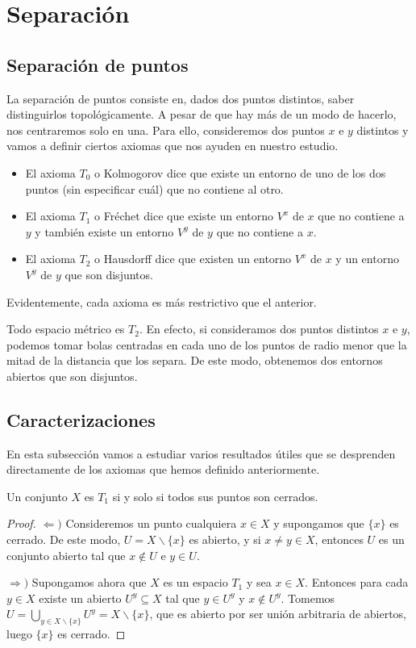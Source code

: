 \chapter{Separación}

\section{Separación de puntos} 

La separación de puntos consiste en, dados dos puntos distintos, saber distinguirlos topológicamente. A pesar de que hay más de un modo de hacerlo, nos centraremos solo en una. Para ello, consideremos dos puntos $x$ e $y$ distintos y vamos a definir ciertos axiomas que nos ayuden en nuestro estudio.

\begin{itemize}
\item El axioma $T_0$ o Kolmogorov dice que existe un entorno de uno de los dos puntos (sin especificar cuál) que no contiene al otro. 
\item El axioma $T_1$ o Fréchet dice que existe un entorno $V^x$ de $x$ que no contiene a $y$ y también existe un entorno $V^y$ de $y$ que no contiene a $x$.
\item El axioma $T_2$ o Hausdorff dice que existen un entorno $V^x$ de $x$ y un entorno $V^y$ de $y$ que son disjuntos. 
\end{itemize}

Evidentemente, cada axioma es más restrictivo que el anterior. 

\begin{obs}
Todo espacio métrico es $T_2$. En efecto, si consideramos dos puntos distintos $x$ e $y$, podemos tomar bolas centradas en cada uno de los puntos de radio menor que la mitad de la distancia que los separa. De este modo, obtenemos dos entornos abiertos que son disjuntos. 
\end{obs}

\section{Caracterizaciones}

En esta subsección vamos a estudiar varios resultados útiles que se desprenden directamente de los axiomas que hemos definido anteriormente. 

\begin{prop}
	Un conjunto $X$ es $T_1$ si y solo si todos sus puntos son cerrados.
	\begin{proof}
		$\Leftarrow)$ Consideremos un punto cualquiera $x\in X$ y supongamos que $\{x\}$ es cerrado. De este modo, $U=X\backslash \{x\}$ es abierto, y si $x\neq y\in X$, entonces $U$ es un conjunto abierto tal que $x\notin U$ e $y\in U$.
		 
		$\Rightarrow)$ Supongamos ahora que $X$ es un espacio $T_1$ y sea $x\in X$. Entonces para cada $y\in X$ existe un abierto $U^y \subseteq X$ tal que $y\in U^y$ y $x\notin U^y$. Tomemos $U=\bigcup_{y\in X\backslash\{x\}}U^y=X\backslash\{x\}$, que es abierto por ser unión arbitraria de abiertos, luego $\{x\}$ es cerrado. 
	\end{proof}
\end{prop}

